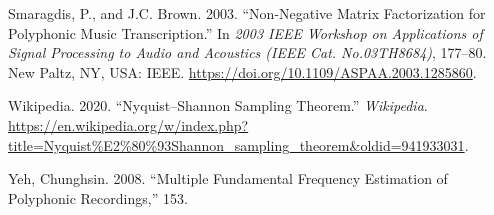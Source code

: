 \documentclass[american,]{article}
\begin{document}
\leavevmode\hypertarget{ref-NNMF}{}%
Smaragdis, P., and J.C. Brown. 2003. ``Non-Negative Matrix Factorization for Polyphonic Music Transcription.'' In \emph{2003 IEEE Workshop on Applications of Signal Processing to Audio and Acoustics (IEEE Cat. No.03TH8684)}, 177--80. New Paltz, NY, USA: IEEE. \url{https://doi.org/10.1109/ASPAA.2003.1285860}.

\leavevmode\hypertarget{ref-wiki:nyquistshannon}{}%
Wikipedia. 2020. ``Nyquist--Shannon Sampling Theorem.'' \emph{Wikipedia}. \url{https://en.wikipedia.org/w/index.php?title=Nyquist\%E2\%80\%93Shannon_sampling_theorem\&oldid=941933031}.

\leavevmode\hypertarget{ref-yeh_thesis}{}%
Yeh, Chunghsin. 2008. ``Multiple Fundamental Frequency Estimation of Polyphonic Recordings,'' 153.
\end{document}
